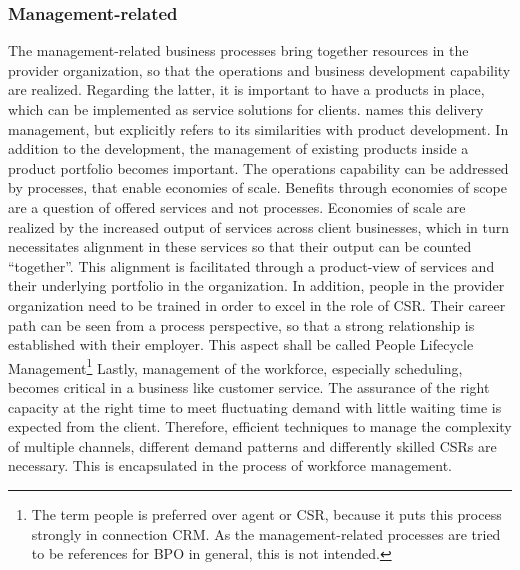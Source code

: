 	\subsubsection{Management-related}
	The management-related business processes bring together resources in the provider organization, so that the operations and business development capability are realized. Regarding the latter, it is important to have a products in place, which can be implemented as service solutions for clients.  \citep{schewe2007} names this delivery management, but explicitly refers to its similarities with product development. In addition to the development, the management of existing products inside a product portfolio becomes important. The operations capability can be addressed by processes, that enable economies of scale. Benefits through economies of scope are a question of offered services and not processes. Economies of scale are realized by the increased output of services across client businesses, which in turn necessitates alignment in these services so that their output can be counted \enquote{together}. This alignment is facilitated through a product-view of services and their underlying portfolio in the organization. In addition, people in the provider organization need to be trained  in order to excel in the role of \acrshort{CSR}. Their career path can be seen from a process perspective, so that a strong relationship is established with their employer. This aspect shall be called People Lifecycle Management\footnote{The term people is preferred over agent or \acrshort{CSR}, because it puts this process strongly in connection \acrshort{CRM}. As the management-related processes are tried to be references for \acrshort{BPO} in general, this is not intended.} Lastly, management of the workforce, especially scheduling, becomes critical in a business like customer service. The assurance of the right capacity at the right time to meet fluctuating demand with little waiting time is expected from the client. Therefore, efficient techniques to manage the complexity of multiple channels, different demand patterns and differently skilled \acrshort{CSR}s are necessary. This is encapsulated in the process of workforce management. 
	
